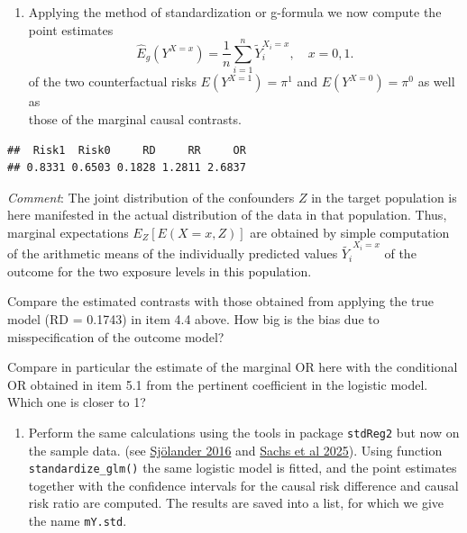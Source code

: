 \documentclass[
]{book}
\newenvironment{Shaded}{\begin{snugshade}}{\end{snugshade}}
\newcommand{\DecValTok}[1]{\textcolor[rgb]{0.00,0.00,0.81}{#1}}
\newcommand{\FunctionTok}[1]{\textcolor[rgb]{0.13,0.29,0.53}{\textbf{#1}}}
\newcommand{\NormalTok}[1]{#1}
\newcommand{\OtherTok}[1]{\textcolor[rgb]{0.56,0.35,0.01}{#1}}
\newcommand{\SpecialCharTok}[1]{\textcolor[rgb]{0.81,0.36,0.00}{\textbf{#1}}}
\providecommand{\tightlist}{%
  \setlength{\itemsep}{0pt}\setlength{\parskip}{0pt}}
\theoremstyle{definition}
\theoremstyle{definition}
\theoremstyle{definition}
\theoremstyle{definition}
\theoremstyle{remark}
\begin{document}
\begin{enumerate}
\def\labelenumi{\arabic{enumi}.}
\setcounter{enumi}{2}
\tightlist
\item
  Applying the method of standardization or g-formula we now compute
  the point estimates \[ \widehat{E}_g(Y^{X=x}) =
   \frac{1}{n} \sum_{i=1}^n \widetilde{Y}_i^{X_i=x}, \quad x=0,1. \]
  of the two counterfactual risks \(E(Y^{X=1}) = \pi^1\) and
  \(E(Y^{X=0})=\pi^0\) as well as\\
  those of the marginal causal contrasts.
\end{enumerate}

\begin{Shaded}
\end{Shaded}

\begin{verbatim}
##  Risk1  Risk0     RD     RR     OR 
## 0.8331 0.6503 0.1828 1.2811 2.6837
\end{verbatim}

\emph{Comment}: The joint distribution of the confounders \(Z\) in the target
population is here manifested in the actual distribution of the data in
that population. Thus, marginal expectations \(E_Z[E(X=x, Z)]\) are
obtained by simple computation of the arithmetic means of the
individually predicted values \(\widetilde{Y_i}^{X_i=x}\) of the outcome
for the two exposure levels in this population.

Compare the estimated contrasts with those obtained from applying the
true model (RD = 0.1743) in item 4.4 above. How big is the bias due to
misspecification of the outcome model?

Compare in particular the estimate of the marginal OR here with the
conditional OR obtained in item 5.1 from the pertinent coefficient in
the logistic model. Which one is closer to 1?

\begin{enumerate}
\def\labelenumi{\arabic{enumi}.}
\setcounter{enumi}{3}
\tightlist
\item
  Perform the same calculations using the tools in package \texttt{stdReg2}
  but now on the sample data. (see \href{https://doi.org/10.1007/s10654-016-0157-3}{Sjölander
  2016} and \href{https://doi.org/10.1016/j.annepidem.2025.04.002}{Sachs et al
  2025}). Using
  function \texttt{standardize\_glm()} the same logistic model is fitted, and
  the point estimates together with the confidence intervals for the
  causal risk difference and causal risk ratio are computed. The
  results are saved into a list, for which we give the name \texttt{mY.std}.
\end{enumerate}
\end{document}
